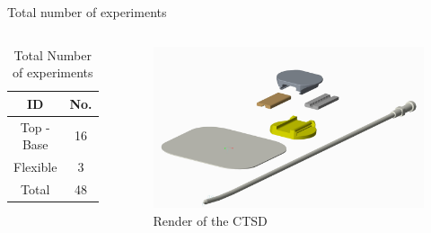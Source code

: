 \documentclass[10pt]{beamer}
\begin{document}
\begin{frame}[fragile]{Total number of experiments}
\vspace{1cm}
\begin{columns}[T,onlytextwidth]
\begin{table}
\begin{centering}
\begin{tabular}{|c|c|}
\hline 
ID & No.\tabularnewline
\hline 
\hline 
Top - Base & 16\tabularnewline
\hline 
Flexible & 3\tabularnewline
\hline 
Total & 48\tabularnewline
\hline 
\end{tabular}
\par\end{centering}
\caption{Total Number of experiments}
\end{table}
\begin{figure}
\includegraphics[scale=0.025]{chesttube}
\caption{Render of the CTSD}
\end{figure}
\end{columns}
\end{frame}
\end{document}
